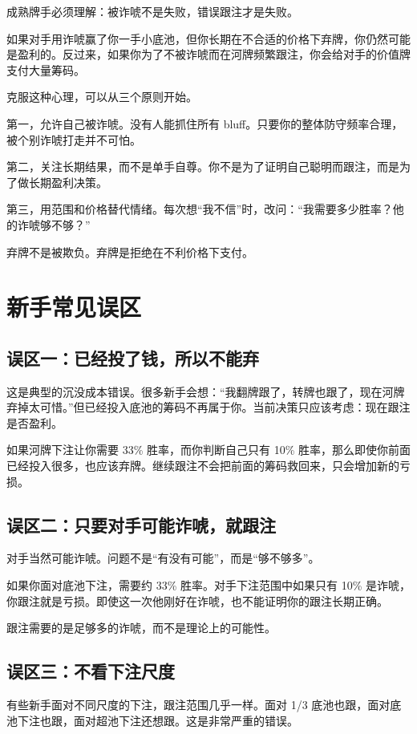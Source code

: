 成熟牌手必须理解：被诈唬不是失败，错误跟注才是失败。

如果对手用诈唬赢了你一手小底池，但你长期在不合适的价格下弃牌，你仍然可能是盈利的。反过来，如果你为了不被诈唬而在河牌频繁跟注，你会给对手的价值牌支付大量筹码。

克服这种心理，可以从三个原则开始。

第一，允许自己被诈唬。没有人能抓住所有 bluff。只要你的整体防守频率合理，被个别诈唬打走并不可怕。

第二，关注长期结果，而不是单手自尊。你不是为了证明自己聪明而跟注，而是为了做长期盈利决策。

第三，用范围和价格替代情绪。每次想“我不信”时，改问：“我需要多少胜率？他的诈唬够不够？”

弃牌不是被欺负。弃牌是拒绝在不利价格下支付。

\section{新手常见误区}

\subsection{误区一：已经投了钱，所以不能弃}

这是典型的沉没成本错误。很多新手会想：“我翻牌跟了，转牌也跟了，现在河牌弃掉太可惜。”但已经投入底池的筹码不再属于你。当前决策只应该考虑：现在跟注是否盈利。

如果河牌下注让你需要 33\% 胜率，而你判断自己只有 10\% 胜率，那么即使你前面已经投入很多，也应该弃牌。继续跟注不会把前面的筹码救回来，只会增加新的亏损。

\subsection{误区二：只要对手可能诈唬，就跟注}

对手当然可能诈唬。问题不是“有没有可能”，而是“够不够多”。

如果你面对底池下注，需要约 33\% 胜率。对手下注范围中如果只有 10\% 是诈唬，你跟注就是亏损。即使这一次他刚好在诈唬，也不能证明你的跟注长期正确。

跟注需要的是足够多的诈唬，而不是理论上的可能性。

\subsection{误区三：不看下注尺度}

有些新手面对不同尺度的下注，跟注范围几乎一样。面对 1/3 底池也跟，面对底池下注也跟，面对超池下注还想跟。这是非常严重的错误。

